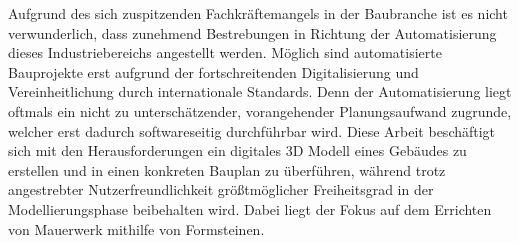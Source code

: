 Aufgrund des sich zuspitzenden Fachkräftemangels in der Baubranche ist es nicht verwunderlich, dass zunehmend Bestrebungen in Richtung der Automatisierung dieses Industriebereichs angestellt werden.
Möglich sind automatisierte Bauprojekte erst aufgrund der fortschreitenden Digitalisierung und Vereinheitlichung durch internationale Standards.
Denn der Automatisierung liegt oftmals ein nicht zu unterschätzender, vorangehender Planungsaufwand zugrunde, welcher erst dadurch softwareseitig durchführbar wird.
Diese Arbeit beschäftigt sich mit den Herausforderungen ein digitales 3D Modell eines Gebäudes zu erstellen und in einen konkreten Bauplan zu überführen, während trotz angestrebter Nutzerfreundlichkeit größtmöglicher Freiheitsgrad in der Modellierungsphase beibehalten wird.
Dabei liegt der Fokus auf dem Errichten von Mauerwerk mithilfe von Formsteinen.